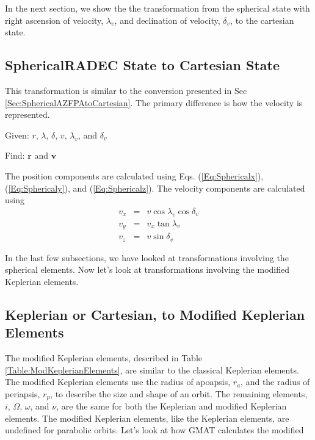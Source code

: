 In the next section, we show the the transformation from the
spherical state  with right ascension of velocity, $\lambda_v$,
and declination of velocity, $\delta_v$, to the cartesian state.

\subsection{SphericalRADEC State to Cartesian State} 

This transformation is similar to the conversion presented in Sec
\ref{Sec:SphericalAZFPAtoCartesian}.  The primary difference is
how the velocity is represented.

\noindent Given:  $r$, $\lambda$, $\delta$, $v$, $\lambda_v$, and
$\delta_v$

\noindent Find:  $\mathbf{r}$ and $\mathbf{v}$

The position components are calculated using Eqs.
(\ref{Eq:Sphericalx}), (\ref{Eq:Sphericaly}), and
(\ref{Eq:Sphericalz}).  The velocity components are calculated
using
%
\begin{eqnarray}
    v_x &=& v\cos{\lambda_v}\cos{\delta_v}\\
    v_y &=& v_x\tan{\lambda_v}\\
    v_z &=& v\sin{\delta_v}
\end{eqnarray}

In the last few subsections, we have looked at transformations
involving the spherical elements.  Now let's look at
transformations involving the modified Keplerian elements.

\subsection{Keplerian or Cartesian, to Modified Keplerian Elements}  

The modified Keplerian elements, described in Table
\ref{Table:ModKeplerianElements}, are similar to the classical
Keplerian elements.  The modified Keplerian elements use the
radius of apoapsis, $r_a$, and the radius of periapsis, $r_p$, to
describe the size and shape of an orbit.  The remaining elements,
$i$, $\Omega$, $\omega$, and $\nu$, are the same for both the
Keplerian and modified Keplerian elements. The modified Keplerian
elements, like the Keplerian elements, are undefined for parabolic
orbits.  Let's look at how GMAT calculates the modified


